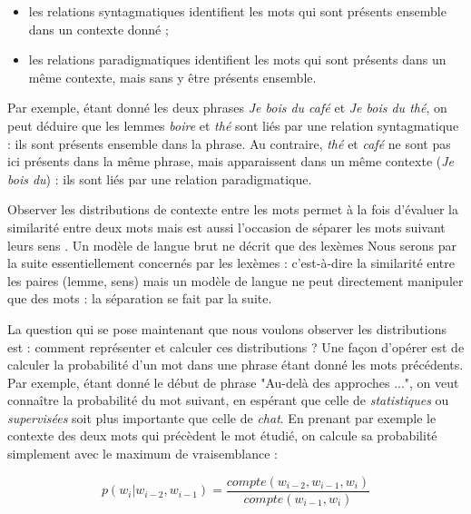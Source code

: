 \begin{itemize}
    \item les relations syntagmatiques identifient les mots qui sont présents
        ensemble dans un contexte donné ;
    \item les relations paradigmatiques identifient les mots qui sont présents
        dans un même contexte, mais sans y être présents ensemble.
\end{itemize}

Par exemple, étant donné les deux phrases \emph{Je bois du café} et \emph{Je
bois du thé}, on peut déduire que les lemmes \emph{boire} et \emph{thé} sont
liés par une relation syntagmatique : ils sont présents ensemble dans la
phrase. Au contraire, \emph{thé} et \emph{café} ne sont pas ici présents dans
la même phrase, mais apparaissent dans un même contexte (\emph{Je bois du}) :
ils sont liés par une relation paradigmatique.

Observer les distributions de contexte entre les mots permet à la fois
d'évaluer la similarité entre deux mots mais est aussi l'occasion de séparer
les mots suivant leurs sens \citep{yarowsky1993one,pantel2002discovering}. Un modèle de langue brut ne décrit que des lexèmes Nous
serons par la suite essentiellement concernés par les lexèmes : c'est-à-dire la
similarité entre les paires (lemme, sens) mais un modèle de langue ne peut
directement manipuler que des mots : la séparation se fait par la suite.


La question qui se pose maintenant que nous voulons observer les distributions
est : comment représenter et calculer ces distributions ? Une façon d'opérer
est de calculer la probabilité d'un mot dans une phrase étant donné les mots
précédents. Par exemple, étant donné le début de phrase "Au-delà des approches
...", on veut connaître la probabilité du mot suivant, en espérant que celle de
\emph{statistiques} ou \emph{supervisées} soit plus importante que celle de
\emph{chat}. En prenant par exemple le contexte des deux mots qui précèdent le
mot étudié, on calcule sa probabilité simplement avec le maximum de
vraisemblance :

\[
p(w_i|w_{i-2}, w_{i-1}) = \frac{compte(w_{i-2}, w_{i-1}, w_i)}{compte(w_{i-1}, w_i)}
\]


